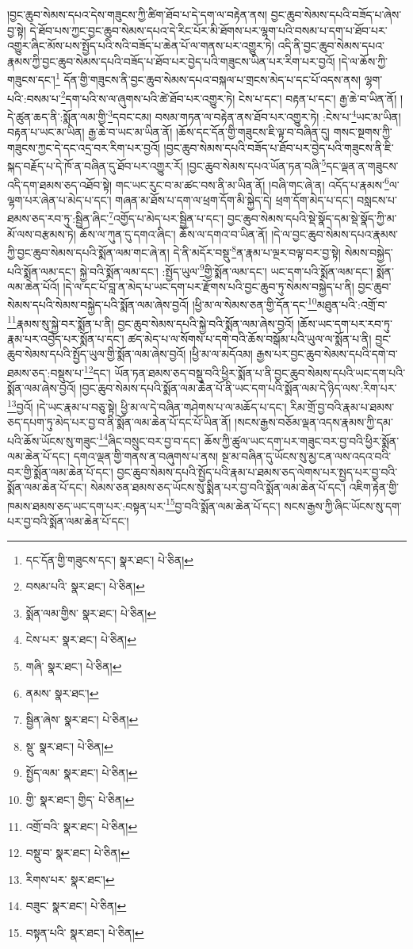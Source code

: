 །བྱང་ཆུབ་སེམས་དཔའ་དེས་གཟུངས་ཀྱི་ཚིག་ཐོབ་པ་དེ་དག་ལ་བརྟེན་ནས། བྱང་ཆུབ་སེམས་དཔའི་བཟོད་པ་ཞེས་བྱ་སྟེ། དེ་ཐོབ་པས་ཀྱང་བྱང་ཆུབ་སེམས་དཔའ་དེ་རིང་པོར་མི་ཐོགས་པར་ལྷག་པའི་བསམ་པ་དག་པ་ཐོབ་པར་འགྱུར་ཞིང་མོས་པས་སྤྱོད་པའི་སའི་བཟོད་པ་ཆེན་པོ་ལ་གནས་པར་འགྱུར་ཏེ། འདི་ནི་བྱང་ཆུབ་སེམས་དཔའ་རྣམས་ཀྱི་བྱང་ཆུབ་སེམས་དཔའི་བཟོད་པ་ཐོབ་པར་བྱེད་པའི་གཟུངས་ཡིན་པར་རིག་པར་བྱའོ། །དེ་ལ་ཆོས་ཀྱི་གཟུངས་དང་།\footnote{དང་དོན་གྱི་གཟུངས་དང་།  སྣར་ཐང་།  པེ་ཅིན། } དོན་གྱི་གཟུངས་ནི་བྱང་ཆུབ་སེམས་དཔའ་བསྐལ་པ་གྲངས་མེད་པ་དང་པོ་འདས་ནས། ལྷག་པའི་:བསམ་པ་\footnote{བསམ་པའི་  སྣར་ཐང་།  པེ་ཅིན། }དག་པའི་ས་ལ་ཞུགས་པའི་ཚེ་ཐོབ་པར་འགྱུར་ཏེ། ངེས་པ་དང་། བརྟན་པ་དང་། རྒྱ་ཆེ་བ་ཡིན་ནོ། །དེ་ཚུན་ཆད་ནི་:སྨོན་ལམ་གྱི་\footnote{སྨོན་ལམ་གྱིས་  སྣར་ཐང་།  པེ་ཅིན། }དབང་ངམ། བསམ་གཏན་ལ་བརྟེན་ནས་ཐོབ་པར་འགྱུར་ཏེ། :ངེས་པ་\footnote{ངེས་པར་  སྣར་ཐང་།  པེ་ཅིན། }ཡང་མ་ཡིན། བརྟན་པ་ཡང་མ་ཡིན། རྒྱ་ཆེ་བ་ཡང་མ་ཡིན་ནོ། །ཆོས་དང་དོན་གྱི་གཟུངས་ཇི་ལྟ་བ་བཞིན་དུ། གསང་སྔགས་ཀྱི་གཟུངས་ཀྱང་དེ་དང་འདྲ་བར་རིག་པར་བྱའོ། །བྱང་ཆུབ་སེམས་དཔའི་བཟོད་པ་ཐོབ་པར་བྱེད་པའི་གཟུངས་ནི་ཇི་སྐད་བརྗོད་པ་དེ་ཁོ་ན་བཞིན་དུ་ཐོབ་པར་འགྱུར་རོ། །བྱང་ཆུབ་སེམས་དཔའ་ཡོན་ཏན་བཞི་\footnote{གཞི་  སྣར་ཐང་།  པེ་ཅིན། }དང་ལྡན་ན་གཟུངས་འདི་དག་ཐམས་ཅད་འཐོབ་སྟེ། གང་ཡང་རུང་བ་མ་ཚང་བས་ནི་མ་ཡིན་ནོ། །བཞི་གང་ཞེ་ན། འདོད་པ་རྣམས་\footnote{ནམས་  སྣར་ཐང་། }ལ་ལྷག་པར་ཞེན་པ་མེད་པ་དང་། གཞན་མ་ཐོས་པ་དག་ལ་ཕྲག་དོག་མི་སྐྱེད་དེ། ཕྲག་དོག་མེད་པ་དང་། བསླངས་པ་ཐམས་ཅད་རབ་ཏུ་:སྦྱིན་ཞིང་\footnote{སྦྱིན་ཞེས་  སྣར་ཐང་།  པེ་ཅིན། }འགྱོད་པ་མེད་པར་སྦྱིན་པ་དང་། བྱང་ཆུབ་སེམས་དཔའི་སྡེ་སྣོད་དམ་སྡེ་སྣོད་ཀྱི་མ་མོ་ལས་བརྩམས་ཏེ། ཆོས་ལ་ཀུན་དུ་དགའ་ཞིང་། ཆོས་ལ་དགའ་བ་ཡིན་ནོ། །དེ་ལ་བྱང་ཆུབ་སེམས་དཔའ་རྣམས་ཀྱི་བྱང་ཆུབ་སེམས་དཔའི་སྨོན་ལམ་གང་ཞེ་ན། དེ་ནི་མདོར་བསྡུ་\footnote{སྡུ་  སྣར་ཐང་།  པེ་ཅིན། }ན་རྣམ་པ་ལྔར་བལྟ་བར་བྱ་སྟེ། སེམས་བསྐྱེད་པའི་སྨོན་ལམ་དང་། སྐྱེ་བའི་སྨོན་ལམ་དང་། :སྤྱོད་ཡུལ་\footnote{སྤྱོད་ལམ་  སྣར་ཐང་།  པེ་ཅིན། }གྱི་སྨོན་ལམ་དང་། ཡང་དག་པའི་སྨོན་ལམ་དང་། སྨོན་ལམ་ཆེན་པོའོ། །དེ་ལ་དང་པོ་བླ་ན་མེད་པ་ཡང་དག་པར་རྫོགས་པའི་བྱང་ཆུབ་ཏུ་སེམས་བསྐྱེད་པ་ནི། བྱང་ཆུབ་སེམས་དཔའི་སེམས་བསྐྱེད་པའི་སྨོན་ལམ་ཞེས་བྱའོ། །ཕྱི་མ་ལ་སེམས་ཅན་གྱི་དོན་དང་\footnote{གྱི་  སྣར་ཐང་། གྱིད་  པེ་ཅིན། }མཐུན་པའི་:འགྲོ་བ་\footnote{འགྲོ་བའི་  སྣར་ཐང་།  པེ་ཅིན། }རྣམས་སུ་སྐྱེ་བར་སྨོན་པ་ནི། བྱང་ཆུབ་སེམས་དཔའི་སྐྱེ་བའི་སྨོན་ལམ་ཞེས་བྱའོ། །ཆོས་ཡང་དག་པར་རབ་ཏུ་རྣམ་པར་འབྱེད་པར་སྨོན་པ་དང་། ཚད་མེད་པ་ལ་སོགས་པ་དགེ་བའི་ཆོས་བསྒོམ་པའི་ཡུལ་ལ་སྨོན་པ་ནི། བྱང་ཆུབ་སེམས་དཔའི་སྤྱོད་ཡུལ་གྱི་སྨོན་ལམ་ཞེས་བྱའོ། །ཕྱི་མ་ལ་མདོའམ། རྒྱས་པར་བྱང་ཆུབ་སེམས་དཔའི་དགེ་བ་ཐམས་ཅད་:བསྡུས་པ་\footnote{བསྡུ་བ་  སྣར་ཐང་།  པེ་ཅིན། }དང་། ཡོན་ཏན་ཐམས་ཅད་བསྡུ་བའི་ཕྱིར་སྨོན་པ་ནི་བྱང་ཆུབ་སེམས་དཔའི་ཡང་དག་པའི་སྨོན་ལམ་ཞེས་བྱའོ། །བྱང་ཆུབ་སེམས་དཔའི་སྨོན་ལམ་ཆེན་པོ་ནི་ཡང་དག་པའི་སྨོན་ལམ་དེ་ཉིད་ལས་:རིག་པར་\footnote{རིགས་པར་  སྣར་ཐང་། }བྱའོ། །དེ་ཡང་རྣམ་པ་བཅུ་སྟེ། ཕྱི་མ་ལ་དེ་བཞིན་གཤེགས་པ་ལ་མཆོད་པ་དང་། རིམ་གྲོ་བྱ་བའི་རྣམ་པ་ཐམས་ཅད་དཔག་ཏུ་མེད་པར་བྱ་བ་ནི་སྨོན་ལམ་ཆེན་པོ་དང་པོ་ཡིན་ནོ། །སངས་རྒྱས་བཅོམ་ལྡན་འདས་རྣམས་ཀྱི་དམ་པའི་ཆོས་ཡོངས་སུ་གཟུང་\footnote{བཟུང་  སྣར་ཐང་།  པེ་ཅིན། }ཞིང་བསྲུང་བར་བྱ་བ་དང་། ཆོས་ཀྱི་ཚུལ་ཡང་དག་པར་གཟུང་བར་བྱ་བའི་ཕྱིར་སྨོན་ལམ་ཆེན་པོ་དང་། དགའ་ལྡན་གྱི་གནས་ན་བཞུགས་པ་ནས། སྔ་མ་བཞིན་དུ་ཡོངས་སུ་མྱ་ངན་ལས་འདའ་བའི་བར་གྱི་སྨོན་ལམ་ཆེན་པོ་དང་། བྱང་ཆུབ་སེམས་དཔའི་སྤྱོད་པའི་རྣམ་པ་ཐམས་ཅད་ལེགས་པར་སྤྱད་པར་བྱ་བའི་སྨོན་ལམ་ཆེན་པོ་དང་། སེམས་ཅན་ཐམས་ཅད་ཡོངས་སུ་སྨིན་པར་བྱ་བའི་སྨོན་ལམ་ཆེན་པོ་དང་། འཇིག་རྟེན་གྱི་ཁམས་ཐམས་ཅད་ཡང་དག་པར་:བསྟན་པར་\footnote{བསྟན་པའི་  སྣར་ཐང་།  པེ་ཅིན། }བྱ་བའི་སྨོན་ལམ་ཆེན་པོ་དང་། སངས་རྒྱས་ཀྱི་ཞིང་ཡོངས་སུ་དག་པར་བྱ་བའི་སྨོན་ལམ་ཆེན་པོ་དང་། 